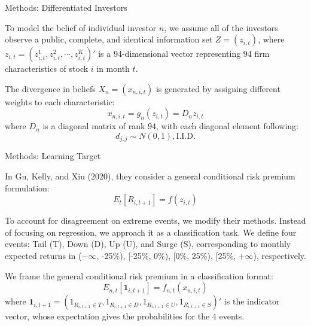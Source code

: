 \documentclass[11pt, aspectratio=169]{beamer}
\newenvironment{wideitemize}{\itemize\addtolength{\itemsep}{10pt}}{\enditemize}
\begin{document}
\begin{frame}{Methods: Differentiated Investors}
\bigskip
\begin{wideitemize}
\item To model the belief of individual investor $n$, we assume all of the investors observe a \alert{public, complete, and identical} information set $Z = (z_{i, t})$, where $z_{i,t}=(z_{i,t}^{1},z_{i,t}^{2},\cdots,z_{i,t}^{K})'$ is a 94-dimensional vector representing 94 firm characteristics of stock $i$ in month $t$.
\item The divergence in beliefs $X_{n} = (x_{n,i,t})$ is generated by assigning different weights to each characteristic:
\begin{equation*}
  x_{n,i,t} = g_n(z_{i,t}) = D_{n}z_{i,t}
\end{equation*}
where $D_{n}$ is a diagonal matrix of rank 94, with each diagonal element following:
\begin{equation*}
  d_{j,j} \sim N(0,1), \text{I.I.D.}
\end{equation*}
\end{wideitemize}
\end{frame}

\begin{frame}{Methods: Learning Target}
\bigskip
\begin{wideitemize}
\item In Gu, Kelly, and Xiu (2020), they consider a general conditional risk premium formulation:
\begin{equation*}
  E_t[R_{i,t+1}] = f(z_{i,t})
\end{equation*}
\item To account for disagreement on extreme events, we modify their methods. \alert{Instead of focusing on regression, we approach it as a classification task}. We define four events: Tail (T), Down (D), Up (U), and Surge (S), corresponding to monthly expected returns in ($-\infty$, -25\%), [-25\%, 0\%), [0\%, 25\%), [25\%, $+\infty$), respectively.
\item We frame the general conditional risk premium in a \alert{classification format}:
\begin{equation*}
  E_{n,t}[\mathbf{1}_{i,t+1}] = f_{n,t}(x_{n,i,t})
\end{equation*}
where $\mathbf{1}_{i,t+1}=(1_{R_{i,t+1}\in T},
  1_{R_{i,t+1}\in D},
  1_{R_{i,t+1}\in U},
1_{R_{i,t+1}\in S})'$ is the indicator vector, whose expectation gives the probabilities for the 4 events.
\end{wideitemize}
\end{frame}
\end{document}
